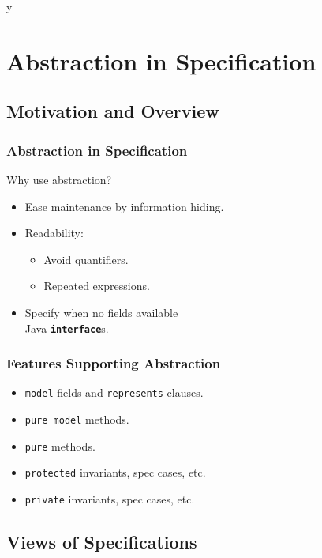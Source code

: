 \if y\MAKEHANDOUTS \documentclass[t,compress,landscape,handout]{beamer}
\begin{document}
\section[Abstr.]{Abstraction in Specification}

\subsection[Motivation]{Motivation and Overview}

\begin{frame}
\frametitle{Abstraction in Specification}

Why use abstraction?
\begin{itemize}
\item
Ease maintenance by information hiding.

\item
Readability:
\begin{itemize}
\item
Avoid quantifiers.

\item
Repeated expressions.
\end{itemize}

\item
Specify when no fields available \\
Java \textbf{\texttt{interface}}s.
\end{itemize}
\end{frame}

\begin{frame}[fragile]
\frametitle{Features Supporting Abstraction}

\begin{itemize}
\item
\lstinline!model! fields and \lstinline!represents! clauses.

\item
\lstinline!pure model! methods.

\item
\lstinline!pure! methods.

\item
\lstinline!protected! invariants, spec cases, etc.

\item
\lstinline!private! invariants, spec cases, etc.
\end{itemize}
\end{frame}

\subsection[Views]{Views of Specifications}
\end{document}
